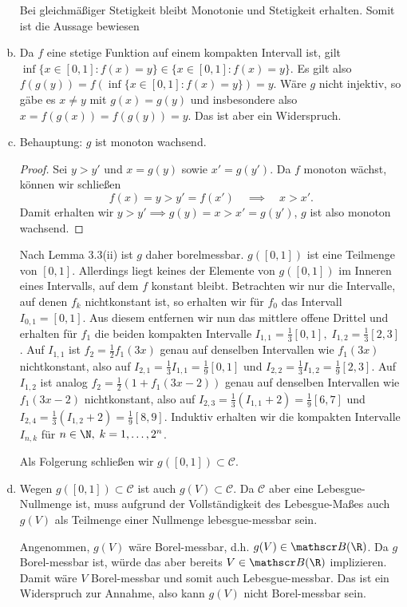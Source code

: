 \documentclass{article}
\begin{document}
\begin{enumerate}[(a)]
        Bei gleichmäßiger Stetigkeit bleibt Monotonie und Stetigkeit erhalten. Somit ist die Aussage bewiesen
        \item Da $f$ eine stetige Funktion auf einem kompakten Intervall ist, gilt $\inf \{x \in [0,1]\colon f(x) = y\} \in \{x \in [0,1]\colon f(x) = y\}$. Es gilt also $f(g(y)) = f(\inf \{x \in [0,1]\colon f(x) = y\}) = y$. Wäre $g$ nicht injektiv, so gäbe es $x\neq y$ mit $g(x) = g(y)$ und insbesondere also $x = f(g(x)) = f(g(y)) = y$. Das ist aber ein Widerspruch.
        \item Behauptung: $g$ ist monoton wachsend.
        \begin{proof}
            Sei $y > y'$ und $x = g(y)$ sowie $x' = g(y')$. Da $f$ monoton wächst, können wir schließen
            \[
                f(x) = y > y' = f(x') \quad \implies\quad  x > x'.
            \]
            Damit erhalten wir $y > y' \implies g(y) = x > x' = g(y')$, $g$ ist also monoton wachsend.
        \end{proof}
        Nach Lemma 3.3(ii) ist $g$ daher borelmessbar.
        $g([0,1])$ ist eine Teilmenge von $[0,1]$. Allerdings liegt keines der Elemente von $g([0,1])$ im Inneren eines Intervalls, auf dem $f$ konstant bleibt.
        Betrachten wir nur die Intervalle, auf denen $f_k$ nichtkonstant ist, so erhalten wir für $f_0$ das Intervall $I_{0,1} = [0,1]$. Aus diesem entfernen wir nun das mittlere offene Drittel und erhalten für $f_1$ die beiden kompakten Intervalle $I_{1,1} = \frac{1}{3}[0,1],\; I_{1,2} = \frac{1}{3}[2,3]$. Auf $I_{1,1}$ ist $f_2 = \frac{1}{2}f_1(3x)$ genau auf denselben Intervallen wie $f_1(3x)$ nichtkonstant, also auf $I_{2,1} = \frac{1}{3}I_{1,1} = \frac{1}{9}[0,1]$ und $I_{2,2} = \frac{1}{3}I_{1,2} = \frac{1}{9}[2,3]$. Auf $I_{1,2}$ ist analog $f_2 = \frac{1}{2}(1 + f_1(3x - 2))$ genau auf denselben Intervallen wie $f_1(3x-2)$ nichtkonstant, also auf $I_{2,3} = \frac{1}{3}(I_{1,1} + 2) = \frac{1}{9}[6,7]$ und $I_{2,4} = \frac{1}{3}(I_{1,2} + 2) = \frac{1}{9}[8,9]$. Induktiv erhalten wir die kompakten Intervalle $I_{n,k}$ für $n \in \N,\; k = 1,\dots, 2^n$.

        Als Folgerung schließen wir $g([0,1]) \subset \mathcal C$.
        \item Wegen $g([0,1]) \subset \mathcal{C}$ ist auch $g(V) \subset \mathcal{C}$. Da $\mathcal{C}$ aber eine Lebesgue-Nullmenge ist, muss aufgrund der Vollständigkeit des Lebesgue-Maßes auch $g(V)$ als Teilmenge einer Nullmenge lebesgue-messbar sein.
        
        Angenommen, $g(V)$ wäre Borel-messbar, d.h. $g(V) \in \mathscr B(\R)$. Da $g$ Borel-messbar ist, würde das aber bereits $V \in \mathscr B(\R)$ implizieren. Damit wäre $V$ Borel-messbar und somit auch Lebesgue-messbar. Das ist ein Widerspruch zur Annahme, also kann $g(V)$ nicht Borel-messbar sein.
    \end{enumerate}
\end{document}
